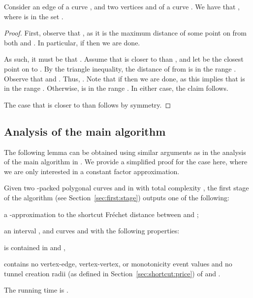 \documentclass[12pt]{article}
\newcommand{\seclab}[1]{\label{sec:#1}}
\newcommand{\secref}[1]{Section~\ref{sec:#1}}
\newcommand{\lemlab}[1]{\label{lemma:#1}}
\newcommand{\Frechet}{Fr\'{e}c{h}e{}t\xspace}\providecommand{\Arr}{\mathop{\mathrm{\EuScript{A}}}}
\newcommand{\tunnel}{tunnel\xspace}
\numberwithin{figure}{section}
\numberwithin{equation}{section}
\begin{document}
\begin{lemma}\lemlab{monotonicity}Consider an edge  of a curve , and
    two vertices  and  of a curve . We have that , where  is in the
    set .
\end{lemma}
\begin{proof}
    First, observe that , as it is the maximum distance of some point on
     from both  and . In particular, if
     then we are
    done.
    
    As such, it must be that . Assume that  is closer to  than , and
    let  be the closest point on  to . By the triangle
    inequality, the distance of  from  is in the range
    .  Observe that  and .  Thus,
    . Note that if
     then we are done, as this
    implies that  is in the range
    . Otherwise,
     is in the range . In either case, the claim
    follows.
    
    The case that  is closer to  than  follows by
    symmetry.
\end{proof}

\subsection{Analysis of the main algorithm}
\seclab{algo:main:analysis}

The following lemma can be obtained using similar arguments as in the
analysis of the main algorithm in \cite{dhw-afdrc-12}. We provide a
simplified proof for the case here, where we are only interested in a
constant factor approximation.


\begin{lemma}\lemlab{first:stage}Given two -packed polygonal curves  and  in
     with total complexity , the first stage of the
    algorithm (see \secref{first:stage}) outputs one of the following:
    \begin{compactenum}[(A)]
        \item a -approximation to the shortcut \Frechet distance
        between  and ;
        \item an interval , and curves  and
         with the following properties:
        \begin{compactenum}[(i)]
            \item  is contained in
             and ,
            
            \item  contains no vertex-edge,
            vertex-vertex, or monotonicity event values and no \tunnel
            creation radii (as defined in \secref{shortcut:price}) of
             and .
        \end{compactenum}
    \end{compactenum}
    The running time is .
\end{lemma}
\end{document}
